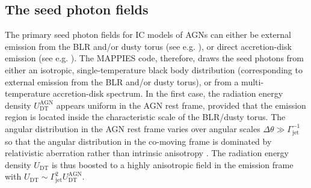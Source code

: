 \documentclass[twocolumn, tighten, twocolappendix]{aastex63}
\begin{document}
\subsection{The seed photon fields}\label{sec:SeedPhotons}
The primary seed photon fields for IC models of AGNs can either be external emission from the BLR and/or dusty torus (see e.g. \cite{Sikora_etal1994, Blazejowski_etal2000, Ghisellini_Tavecchio_2008}), or direct accretion-disk emission (see e.g. \cite{Dermer_Schlickeiser_1993, Bottcher_etal1997, Dermer_Schlickeiser_2002}). The MAPPIES code, therefore, draws the seed photons from either an isotropic, single-temperature black body distribution (corresponding to external emission from the BLR and/or dusty torus), or from a multi-temperature accretion-disk spectrum. In the first case, the radiation energy density $U_{\mathrm{DT}}^{\mathrm{AGN}}$ appears uniform in the AGN rest frame, provided that the emission region is located inside the characteristic scale of the BLR/dusty torus. The angular distribution in the AGN rest frame varies over angular scales $\Delta \theta \gg \Gamma_{\mathrm{jet}}^{-1}$ so that the angular distribution in the co-moving frame is dominated by relativistic aberration rather than intrinsic anisotropy \citep{Bottcher_etal2013}. The radiation energy density $U_{\mathrm{DT}}$ is thus boosted to a highly anisotropic field in the emission frame with $U_{\mathrm{DT}}\sim \Gamma_{\mathrm{jet}}^2U^{\mathrm{AGN}}_{\mathrm{DT}}$.
\end{document}

